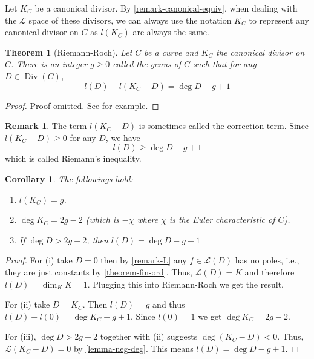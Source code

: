 \documentclass[12pt]{article}
\newtheorem{theorem}{Theorem}[subsection]
\newtheorem{corollary}{Corollary}[subsection]
\theoremstyle{remark}
\theoremstyle{definition}
\newtheorem{remark}{Remark}[subsection]
\newcommand{\Div}[0]{\operatorname{Div}}
\begin{document}
            Let $K_C$ be a canonical divisor. By \autoref{remark-canonical-equiv}, when dealing with the $\mathcal L$ space of these divisors, we can always use the notation $K_C$ to represent any canonical divisor on $C$ as $l(K_C)$ are always the same.
            \begin{theorem}[Riemann-Roch]\label{theorem-rr}
                Let $C$ be a curve and $K_C$ the canonical divisor on $C$. There is an integer $g\geqslant 0$ called the \textup{genus of $C$} such that for any $D\in\Div(C)$,
                \[l(D)-l(K_C-D)=\deg D-g+1\]
            \end{theorem}
            \begin{proof}
                Proof omitted. See \cite{hartshorne_2010_algebraic} for example.
            \end{proof}
            \begin{remark}
                The term $l(K_C-D)$ is sometimes called the correction term. Since $l(K_C-D)\geqslant 0$ for any $D$, we have
                \[l(D)\geqslant \deg D-g+1\]
                which is called Riemann's inequality.
            \end{remark}
            \begin{corollary}\label{corollary-rr-simple}
                The followings hold:
                \begin{enumerate}[\normalfont(i)]
                    \item $l(K_C)=g$.
                    \item $\deg K_C=2g-2$ (which is $-\chi$ where $\chi$ is the Euler characteristic of $C$).
                    \item If $\deg D>2g-2$, then $l(D)=\deg D-g+1$
                \end{enumerate}
            \end{corollary}
            \begin{proof}
                For (i) take $D=0$ then by \autoref{remark-L} any $f\in \mathcal L(D)$ has no poles, i.e., they are just constants by \autoref{theorem-fin-ord}. Thus, $\mathcal L(D)=K$ and therefore $l(D)=\dim_K K=1$. Plugging this into Riemann-Roch we get the result.
                
                For (ii) take $D=K_C$. Then $l(D)=g$ and thus $l(D)-l(0)=\deg K_C-g+1$. Since $l(0)=1$ we get $\deg K_C=2g-2$.
                
                For (iii), $\deg D>2g-2$ together with (ii) suggests $\deg(K_C-D)<0$. Thus, $\mathcal L(K_C-D)=0$ by \autoref{lemma-neg-deg}. This means $l(D)=\deg D-g+1$.
            \end{proof}
            
\end{document}
